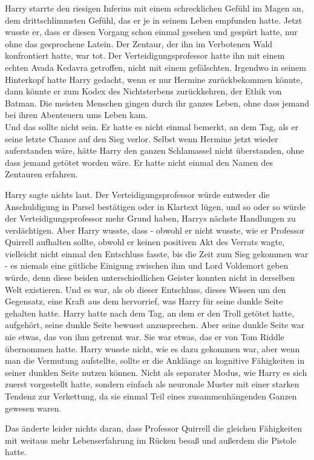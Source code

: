 {Harry starrte den riesigen Inferius mit einem schrecklichen Gefühl im Magen an, dem drittschlimmsten Gefühl, das er je in seinem Leben empfunden hatte. Jetzt wusste er, dass er diesen Vorgang schon einmal gesehen und gespürt hatte, nur ohne das gesprochene Latein. Der Zentaur, der ihn im Verbotenen Wald konfrontiert hatte, war tot. Der Verteidigungsprofessor hatte ihn mit einem echten Avada Kedavra getroffen, nicht mit einem gefälschten. Irgendwo in seinem Hinterkopf hatte Harry gedacht, wenn er nur Hermine zurückbekommen könnte, dann könnte er zum Kodex des Nichtsterbens zurückkehren, der Ethik von Batman. Die meisten Menschen gingen durch ihr ganzes Leben, ohne dass jemand bei ihren Abenteuern ums Leben kam.\\ Und das sollte nicht sein. Er hatte es nicht einmal bemerkt, an dem Tag, als er seine letzte Chance auf den Sieg verlor. Selbst wenn Hermine jetzt wieder auferstanden wäre, hätte Harry den ganzen Schlamassel nicht überstanden, ohne dass jemand getötet worden wäre. Er hatte nicht einmal den Namen des Zentauren erfahren.

Harry sagte nichts laut. Der Verteidigungsprofessor würde entweder die Anschuldigung in Parsel bestätigen oder in Klartext lügen, und so oder so würde der Verteidigungsprofessor mehr Grund haben, Harrys nächste Handlungen zu verdächtigen. Aber Harry wusste, dass - obwohl er nicht wusste, wie er Professor Quirrell aufhalten sollte, obwohl er keinen positiven Akt des Verrats wagte, vielleicht nicht einmal den Entschluss fasste, bis die Zeit zum Sieg gekommen war - es niemals eine gütliche Einigung zwischen ihm und Lord Voldemort geben würde, denn diese beiden unterschiedlichen Geister konnten nicht in derselben Welt existieren. Und es war, als ob dieser Entschluss, dieses Wissen um den Gegensatz, eine Kraft aus dem hervorrief, was Harry für seine dunkle Seite gehalten hatte. Harry hatte nach dem Tag, an dem er den Troll getötet hatte, aufgehört, seine dunkle Seite bewusst anzusprechen. Aber seine dunkle Seite war nie etwas, das von ihm getrennt war. Sie war etwas, das er von Tom Riddle übernommen hatte. Harry wusste nicht, wie es dazu gekommen war, aber wenn man die Vermutung aufstellte, sollte er die Anklänge an kognitive Fähigkeiten in seiner dunklen Seite nutzen können. Nicht als separater Modus, wie Harry es sich zuerst vorgestellt hatte, sondern einfach als neuronale Muster mit einer starken Tendenz zur Verkettung, da sie einmal Teil eines zusammenhängenden Ganzen gewesen waren.

Das änderte leider nichts daran, dass Professor Quirrell die gleichen Fähigkeiten mit weitaus mehr Lebenserfahrung im Rücken besaß und außerdem die Pistole hatte.

}
